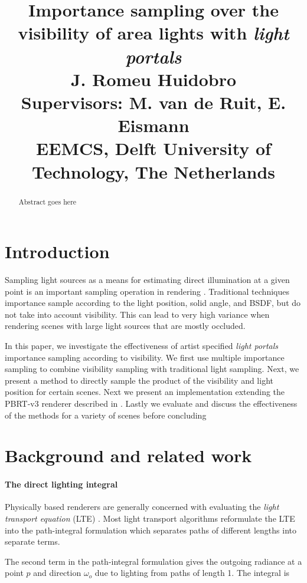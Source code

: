 \documentclass[twocolumn]{article}
\title{%
  \huge \textbf{Importance sampling over the visibility of area lights with \emph{light portals}}\\
  \vspace{0.4cm}
  \Large J. Romeu Huidobro\\
  \vspace{0.3cm}
  \large Supervisors:\; M. van de Ruit, E. Eismann\\
  \vspace{0.3cm}
  EEMCS, Delft University of Technology, The Netherlands
}
\author{}
\date{}
\begin{document}
\newcommand{\from}[0]{\leftarrow}


\maketitle

\begin{abstract}
Abstract goes here
\end{abstract}

\section{Introduction}
Sampling light sources as a means for estimating direct illumination at a given point is an important sampling operation in rendering \cite{pharrPhysicallyBasedRendering2016}. Traditional techniques importance sample according to the light position, solid angle, and BSDF, but do not take into account visibility. This can lead to very high variance when rendering scenes with large light sources that are mostly occluded. 

In this paper, we investigate the effectiveness of artist specified \emph{light portals} importance sampling according to visibility. We first use multiple importance sampling \cite*[]{veachROBUSTMONTECARLO} to combine visibility sampling with traditional light sampling. Next, we present a method to directly sample the product of the visibility and light position for certain scenes. Next we present an implementation extending the PBRT-v3 renderer described in \cite*[]{pharrPhysicallyBasedRendering2016}. Lastly we evaluate and discuss the effectiveness of the methods for a variety of scenes before concluding

\section{Background and related work}

\paragraph{The direct lighting integral} Physically based renderers are generally concerned with evaluating the \emph{light transport equation} (LTE) \cite*[]{kajiyaRENDERINGEQUATION1986}. Most light transport algorithms reformulate the LTE into the path-integral formulation \cite*[]{veachROBUSTMONTECARLO} which separates paths of different lengths into separate terms. 

The second term in the path-integral formulation gives the outgoing radiance at a point $p$ and direction $\omega_o$ due to lighting from paths of length 1. The integral is
\end{document}
